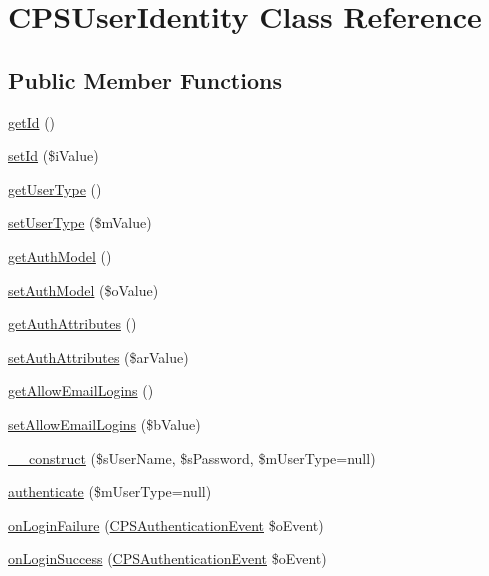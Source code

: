 \hypertarget{classCPSUserIdentity}{
\section{CPSUserIdentity Class Reference}
\label{classCPSUserIdentity}
}
\subsection*{Public Member Functions}
\begin{DoxyCompactItemize}
\item 
\hyperlink{classCPSUserIdentity_a12251d0c022e9e21c137a105ff683f13}{getId} ()
\item 
\hyperlink{classCPSUserIdentity_aedb8a2d647c84d8b613e0eb65778e671}{setId} (\$iValue)
\item 
\hyperlink{classCPSUserIdentity_a93111a7cb02edd6d769aeec0921174d1}{getUserType} ()
\item 
\hyperlink{classCPSUserIdentity_ac5718c6f5c3c700f3911d644ab8b1a21}{setUserType} (\$mValue)
\item 
\hyperlink{classCPSUserIdentity_a3710d677dc2cf402f471be9a28281940}{getAuthModel} ()
\item 
\hyperlink{classCPSUserIdentity_a1612de4800e80ac3069d4e7dbf8fc0a7}{setAuthModel} (\$oValue)
\item 
\hyperlink{classCPSUserIdentity_a7b7bf1385142fab0d25f5a8d1c0026c3}{getAuthAttributes} ()
\item 
\hyperlink{classCPSUserIdentity_a82d08eb0501b94eac210ecabb20e3576}{setAuthAttributes} (\$arValue)
\item 
\hyperlink{classCPSUserIdentity_a114b61ba02fa6660704abd5e02cbc182}{getAllowEmailLogins} ()
\item 
\hyperlink{classCPSUserIdentity_a5232d830bd0fd0fdbf533f07df2bb921}{setAllowEmailLogins} (\$bValue)
\item 
\hyperlink{classCPSUserIdentity_aac5b1d7698855dcc53805a4fb2c366c5}{\_\-\_\-construct} (\$sUserName, \$sPassword, \$mUserType=null)
\item 
\hyperlink{classCPSUserIdentity_a9d4e54a068e9d6a0ba77fc031e84b3a4}{authenticate} (\$mUserType=null)
\item 
\hyperlink{classCPSUserIdentity_a691b36fca62e6932b3d3ca4c35575873}{onLoginFailure} (\hyperlink{classCPSAuthenticationEvent}{CPSAuthenticationEvent} \$oEvent)
\item 
\hyperlink{classCPSUserIdentity_a241daa7d5fc4a48b871a6cea8142f0ac}{onLoginSuccess} (\hyperlink{classCPSAuthenticationEvent}{CPSAuthenticationEvent} \$oEvent)
\end{DoxyCompactItemize}

